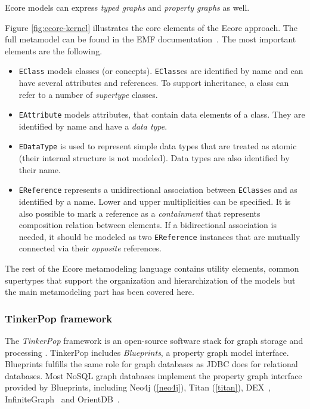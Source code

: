Ecore models can express \emph{typed graphs} and \emph{property graphs} as well.


Figure \ref{fig:ecore-kernel} illustrates the core elements of the Ecore approach. The full metamodel can be found in the EMF documentation~\cite{ecore}. The most important elements are the following.
 
\begin{itemize}
  \item \verb+EClass+ models classes (or concepts). \verb+EClass+es are identified by name and can have several attributes and references. To support inheritance, a class can refer to a number of \emph{supertype} classes.
  \item \verb+EAttribute+ models attributes, that contain data elements of a class. They are identified by name and have a \emph{data type}.
  \item \verb+EDataType+ is used to represent simple data types that are treated as atomic (their internal structure is not modeled). Data types are also identified by their name.
  \item \verb+EReference+ represents a unidirectional association between \verb+EClass+es and as identified by a name. Lower and upper multiplicities can be specified. It is also possible to mark a reference as a \emph{containment} that represents composition relation between elements. If a bidirectional association is needed, it should be modeled as two \verb+EReference+ instances that are mutually connected via their \emph{opposite} references.
\end{itemize}

The rest of the Ecore metamodeling language contains utility elements, common supertypes that support the organization and hierarchization of the models but the main metamodeling part has been covered here.

\subsubsection{TinkerPop framework}

The \emph{TinkerPop} framework is an open-source software stack for graph storage and processing \cite{TinkerPop}. TinkerPop includes \emph{Blueprints}, a property graph model interface. Blueprints fulfills the same role for graph databases as JDBC does for relational databases. Most NoSQL graph databases implement the property graph interface provided by Blueprints, including Neo4j (\autoref{neo4j}), Titan (\autoref{titan}), DEX~\cite{DEX}, InfiniteGraph~\cite{InfiniteGraph} and OrientDB~\cite{OrientDB}.

